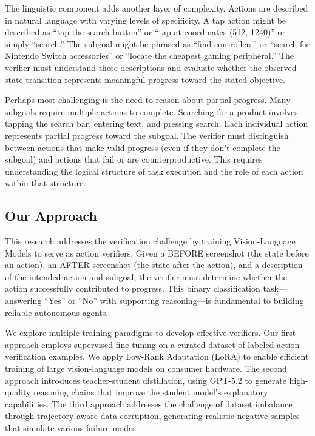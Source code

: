 \documentclass[11pt,a4paper]{article}
\begin{document}
The linguistic component adds another layer of complexity. Actions are described in natural language with varying levels of specificity. A tap action might be described as ``tap the search button'' or ``tap at coordinates (512, 1240)'' or simply ``search.'' The subgoal might be phrased as ``find controllers'' or ``search for Nintendo Switch accessories'' or ``locate the cheapest gaming peripheral.'' The verifier must understand these descriptions and evaluate whether the observed state transition represents meaningful progress toward the stated objective.

Perhaps most challenging is the need to reason about partial progress. Many subgoals require multiple actions to complete. Searching for a product involves tapping the search bar, entering text, and pressing search. Each individual action represents partial progress toward the subgoal. The verifier must distinguish between actions that make valid progress (even if they don't complete the subgoal) and actions that fail or are counterproductive. This requires understanding the logical structure of task execution and the role of each action within that structure.

\subsection{Our Approach}

This research addresses the verification challenge by training Vision-Language Models to serve as action verifiers. Given a BEFORE screenshot (the state before an action), an AFTER screenshot (the state after the action), and a description of the intended action and subgoal, the verifier must determine whether the action successfully contributed to progress. This binary classification task---answering ``Yes'' or ``No'' with supporting reasoning---is fundamental to building reliable autonomous agents.

We explore multiple training paradigms to develop effective verifiers. Our first approach employs supervised fine-tuning on a curated dataset of labeled action verification examples. We apply Low-Rank Adaptation (LoRA) to enable efficient training of large vision-language models on consumer hardware. The second approach introduces teacher-student distillation, using GPT-5.2 to generate high-quality reasoning chains that improve the student model's explanatory capabilities. The third approach addresses the challenge of dataset imbalance through trajectory-aware data corruption, generating realistic negative samples that simulate various failure modes.
\end{document}
